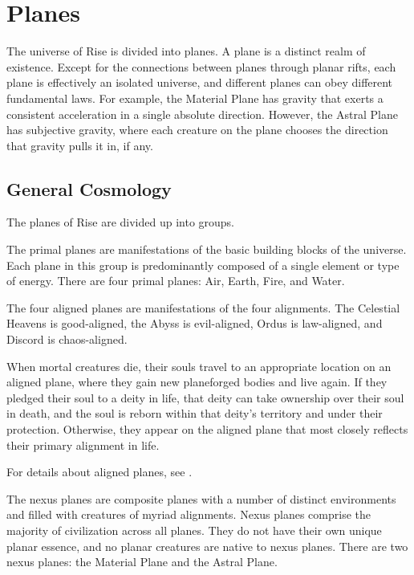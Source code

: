 \section{Planes}\label{Planes}
  The universe of Rise is divided into planes.
  A plane is a distinct realm of existence.
  Except for the connections between planes through planar rifts, each plane is effectively an isolated universe, and different planes can obey different fundamental laws.
  For example, the Material Plane has gravity that exerts a consistent acceleration in a single absolute direction.
  However, the Astral Plane has subjective gravity, where each creature on the plane chooses the direction that gravity pulls it in, if any.

  \subsection{General Cosmology}
    The planes of Rise are divided up into groups.

     The primal planes are manifestations of the basic building blocks of the universe.
    Each plane in this group is predominantly composed of a single element or type of energy.
    There are four primal planes: Air, Earth, Fire, and Water.

     The four aligned planes are manifestations of the four alignments.
    The Celestial Heavens is good-aligned, the Abyss is evil-aligned, Ordus is law-aligned, and Discord is chaos-aligned.

    When mortal creatures die, their souls travel to an appropriate location on an aligned plane, where they gain new planeforged bodies and live again.
    If they pledged their soul to a deity in life, that deity can take ownership over their soul in death, and the soul is reborn within that deity's territory and under their protection.
    Otherwise, they appear on the aligned plane that most closely reflects their primary alignment in life.

    For details about aligned planes, see .

     The nexus planes are composite planes with a number of distinct environments and filled with creatures of myriad alignments.
    Nexus planes comprise the majority of civilization across all planes.
    They do not have their own unique planar essence, and no planar creatures are native to nexus planes.
    There are two nexus planes: the Material Plane and the Astral Plane.


